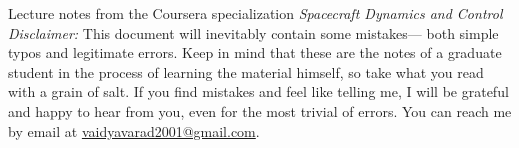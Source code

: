Lecture notes from the Coursera specialization \textit{Spacecraft Dynamics and Control}\\

\textit{Disclaimer:} This document will inevitably contain some mistakes— both
simple typos and legitimate errors. Keep in mind that these are the notes of a graduate student in the process of learning the material himself, so take
what you read with a grain of salt. If you find mistakes and feel like telling
me, I will be grateful and happy to hear from you, even for the most trivial of
errors. You can reach me by email at
\href{mailto:vaidyavaraa2001@gmail.com}{vaidyavarad2001@gmail.com}.